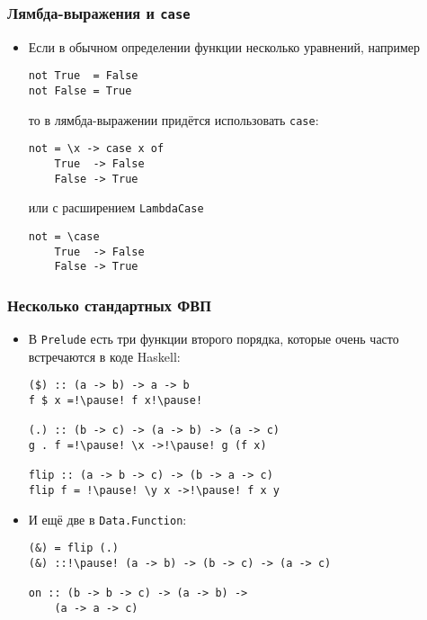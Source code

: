 \documentclass[10pt]{beamer}
\begin{document}
\begin{frame}[fragile]
  \frametitle{Лямбда-выражения и \lstinline|case|}
  \begin{itemize}
    \item Если в обычном определении функции несколько уравнений, например
          \begin{lstlisting}
not True  = False
not False = True
\end{lstlisting}
          то в лямбда-выражении придётся использовать \lstinline|case|:\pause
          \begin{lstlisting}
not = \x -> case x of
    True  -> False
    False -> True
\end{lstlisting}\pause
          или с расширением \lstinline|LambdaCase|
          \begin{lstlisting}
not = \case
    True  -> False
    False -> True
\end{lstlisting}
  \end{itemize}
\end{frame}

\begin{frame}[fragile]
  \frametitle{Несколько стандартных ФВП}
  \begin{itemize}
    \item В \lstinline|Prelude| есть три функции второго порядка, которые очень часто встречаются в коде Haskell:
          \begin{lstlisting}
($) :: (a -> b) -> a -> b
f $ x =!\pause! f x!\pause!

(.) :: (b -> c) -> (a -> b) -> (a -> c)
g . f =!\pause! \x ->!\pause! g (f x)

flip :: (a -> b -> c) -> (b -> a -> c)
flip f = !\pause! \y x ->!\pause! f x y
\end{lstlisting}
    \item И ещё две в \lstinline|Data.Function|:
          \begin{lstlisting}
(&) = flip (.)
(&) ::!\pause! (a -> b) -> (b -> c) -> (a -> c)

on :: (b -> b -> c) -> (a -> b) -> 
    (a -> a -> c)
\end{lstlisting}
  \end{itemize}
\end{frame}
\end{document}
